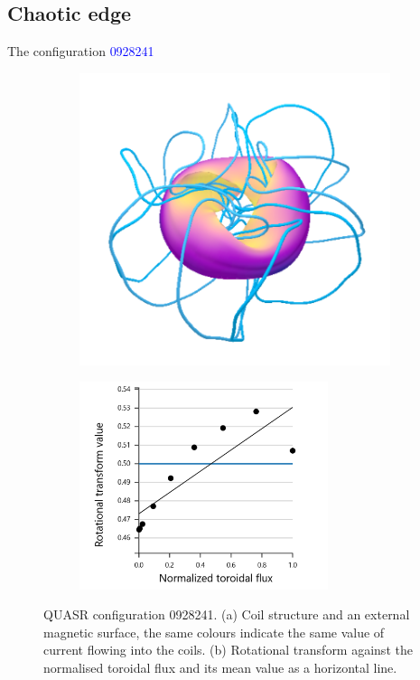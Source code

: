 \subsection{Chaotic edge}\label{sec:quars-0928241}

The configuration {\textcolor{blue}{0928241}}


\begin{figure}[H]
    \centering
    \begin{subfigure}[t]{0.49\textwidth}
        \centering
        \includegraphics[width=\textwidth]{images/quasrs/config-0928241.png}
        \caption{}
        \label{fig:coils-0928241}
    \end{subfigure}
    \hfill
    \begin{subfigure}[t]{0.49\textwidth}
        \centering
        \includegraphics[width=0.8\textwidth]{images/quasrs/iota-0928241.png}
        \caption{}
        \label{fig:iota-0928241}
    \end{subfigure}
    \caption{QUASR configuration 0928241. (a) Coil structure and an external magnetic surface, the same colours indicate the same value of current flowing into the coils. (b) Rotational transform against the normalised toroidal flux and its mean value as a horizontal line.}
    \label{fig:config-0928241}
\end{figure}


